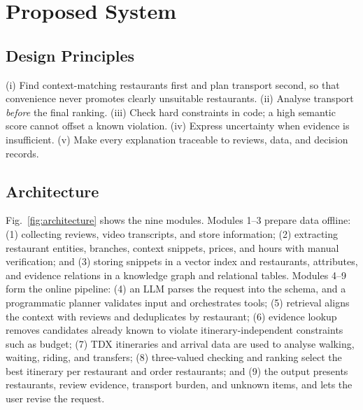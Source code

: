 \documentclass[conference]{IEEEtran}
\begin{document}
\section{Proposed System}\label{sec:method}

\subsection{Design Principles}
(i) Find context-matching restaurants first and plan transport second, so that convenience never promotes clearly unsuitable restaurants. (ii) Analyse transport \emph{before} the final ranking. (iii) Check hard constraints in code; a high semantic score cannot offset a known violation. (iv) Express uncertainty when evidence is insufficient. (v) Make every explanation traceable to reviews, data, and decision records.

\subsection{Architecture}
Fig.~\ref{fig:architecture} shows the nine modules. Modules 1--3 prepare data offline: (1) collecting reviews, video transcripts, and store information; (2) extracting restaurant entities, branches, context snippets, prices, and hours with manual verification; and (3) storing snippets in a vector index and restaurants, attributes, and evidence relations in a knowledge graph and relational tables. Modules 4--9 form the online pipeline: (4) an LLM parses the request into the schema, and a programmatic planner validates input and orchestrates tools; (5) retrieval aligns the context with reviews and deduplicates by restaurant; (6) evidence lookup removes candidates already known to violate itinerary-independent constraints such as budget; (7) TDX itineraries and arrival data are used to analyse walking, waiting, riding, and transfers; (8) three-valued checking and ranking select the best itinerary per restaurant and order restaurants; and (9) the output presents restaurants, review evidence, transport burden, and unknown items, and lets the user revise the request.
\end{document}
